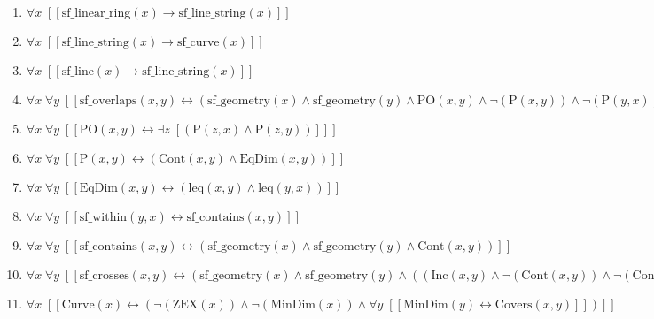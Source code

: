\documentclass{article}
\begin{document}
\begin{enumerate}
\item $\forall x\;  \left[ \left[ \textrm{sf\_linear\_ring}(x) \rightarrow \textrm{sf\_line\_string}(x) \right] \right]$
\item $\forall x\;  \left[ \left[ \textrm{sf\_line\_string}(x) \rightarrow \textrm{sf\_curve}(x) \right] \right]$
\item $\forall x\;  \left[ \left[ \textrm{sf\_line}(x) \rightarrow \textrm{sf\_line\_string}(x) \right] \right]$
\item $\forall x\; \forall y\;  \left[ \left[ \textrm{sf\_overlaps}(x,y) \leftrightarrow \left(\textrm{sf\_geometry}(x) \land \textrm{sf\_geometry}(y) \land \textrm{PO}(x,y) \land \neg \left(\textrm{P}(x,y)\right) \land \neg \left(\textrm{P}(y,x)\right)\right) \right] \right]$
\item $\forall x\; \forall y\;  \left[ \left[ \textrm{PO}(x,y) \leftrightarrow \exists z\;  \left[ \left(\textrm{P}(z,x) \land \textrm{P}(z,y)\right) \right] \right] \right]$
\item $\forall x\; \forall y\;  \left[ \left[ \textrm{P}(x,y) \leftrightarrow \left(\textrm{Cont}(x,y) \land \textrm{EqDim}(x,y)\right) \right] \right]$
\item $\forall x\; \forall y\;  \left[ \left[ \textrm{EqDim}(x,y) \leftrightarrow \left(\textrm{leq}(x,y) \land \textrm{leq}(y,x)\right) \right] \right]$
\item $\forall x\; \forall y\;  \left[ \left[ \textrm{sf\_within}(y,x) \leftrightarrow \textrm{sf\_contains}(x,y) \right] \right]$
\item $\forall x\; \forall y\;  \left[ \left[ \textrm{sf\_contains}(x,y) \leftrightarrow \left(\textrm{sf\_geometry}(x) \land \textrm{sf\_geometry}(y) \land \textrm{Cont}(x,y)\right) \right] \right]$
\item $\forall x\; \forall y\;  \left[ \left[ \textrm{sf\_crosses}(x,y) \leftrightarrow \left(\textrm{sf\_geometry}(x) \land \textrm{sf\_geometry}(y) \land \left(\left(\textrm{Inc}(x,y) \land \neg \left(\textrm{Cont}(x,y)\right) \land \neg \left(\textrm{Cont}(y,x)\right)\right) \lor \forall z\;  \left[ \left[ \left(\textrm{Cont}(z,x) \land \textrm{Cont}(z,y)\right) \rightarrow \left(\textrm{lt}(z,x) \land \textrm{lt}(z,y) \land \neg \left(\textrm{BCont}(z,x)\right) \land \neg \left(\textrm{BCont}(z,y)\right)\right) \right] \right] \lor \left(\textrm{SC}(x,y) \land \textrm{Curve}(x) \land \textrm{Curve}(y)\right)\right)\right) \right] \right]$
\item $\forall x\;  \left[ \left[ \textrm{Curve}(x) \leftrightarrow \left(\neg \left(\textrm{ZEX}(x)\right) \land \neg \left(\textrm{MinDim}(x)\right) \land \forall y\;  \left[ \left[ \textrm{MinDim}(y) \leftrightarrow \textrm{Covers}(x,y) \right] \right]\right) \right] \right]$

\end{enumerate}
\end{document}
